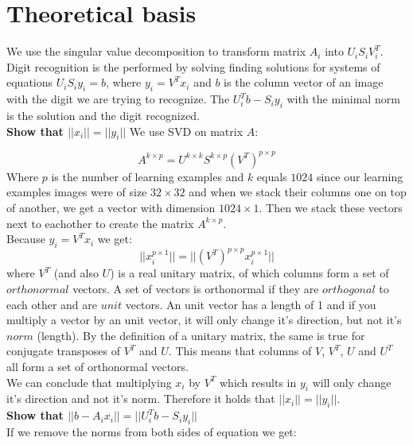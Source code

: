 \documentclass[12pt]{article}
\begin{document}
\section{Theoretical basis}
We use the singular value decomposition to transform matrix $A_i$ into $U_iS_iV_i^{T}$. Digit recognition is the performed by solving finding solutions for systems of equations $U_iS_iy_i = b$, where $y_i = V^Tx_i$ and $b$ is the column vector of an image with the digit we are trying to recognize. The $U_i^{T}b - S_iy_i$ with the minimal norm is the solution and the digit recognized. \\
\newline
\textbf{Show that $||x_i|| = ||y_i||$} 
\newline
We use SVD on matrix $A$:

\[
A^{k \times p} = U^{k \times k}S^{k \times p}(V^T)^{p \times p}
\]
\newline
Where $p$ is the number of learning examples and $k$ equals $1024$ since our learning examples images were of size $32 \times 32$ and when we stack their columns one on top of another, we get a vector with dimension $1024 \times 1$. Then we stack these vectors next to eachother to create the matrix $A^{k \times p}$. \\
\newline
Because $y_i = V^Tx_i$ we get:
\newline
\[
 ||x_i^{p \times 1}|| = || (V^T)^{ p \times p} x_i^{p \times 1}||
\]
\newline
where $V^T$ (and also $U$) is a real unitary matrix, of which columns form a set of $orthonormal$ vectors. A set of vectors is orthonormal if they are $orthogonal$ to each other and are $unit$ vectors. An unit vector has a length of 1 and if you multiply a vector by an unit vector, it will only change it's direction, but not it's $norm$ (length). By the definition of a unitary matrix, the same is true for conjugate transposes of $V^T$ and $U$. This means that columns of $V$, $V^T$, $U$ and $U^T$ all form a set of orthonormal vectors. \\
\newline
We can conclude that multiplying $x_i$ by $V^T$ which results in $y_i$ will only change it's direction and not it's norm. Therefore it holds that $||x_i|| = ||y_i||$. \\
\newline
\textbf{Show that $||b - A_ix_i|| = ||U_i^{T}b - S_iy_i||$} \\
If we remove the norms from both sides of equation we get:\\
\end{document}
